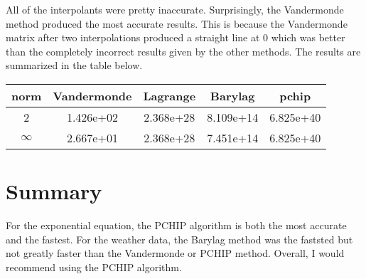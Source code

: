 \documentclass{article}
\begin{document}
All of the interpolants were pretty inaccurate. Surprisingly, the Vandermonde method produced the most accurate results. This is because the Vandermonde matrix after two interpolations produced a straight line at 0 which was better than the completely incorrect results given by the other methods. The results are summarized in the table below.

\begin{center}
\begin{tabular}{| c | c | c | c | c |}
\hline norm & Vandermonde & Lagrange & Barylag & pchip \\ \hline \hline 
2 & 1.426e+02 & 2.368e+28 &  8.109e+14 & 6.825e+40 \\ \hline 
$\infty$ & 2.667e+01 & 2.368e+28 &  7.451e+14 & 6.825e+40 \\ \hline 
\end{tabular}
\end{center}



\section{Summary}

For the exponential equation, the PCHIP algorithm is both the most accurate and the fastest. For the weather data, the Barylag method was the faststed but not greatly faster than the Vandermonde or PCHIP method. Overall, I would recommend using the PCHIP algorithm. 
\end{document}

